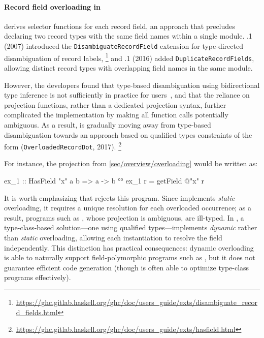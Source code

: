 \documentclass[acmsmall,screen,nonacm%
\Anonymous{,anonymous}{}%
\Final{}{,review}%
]{acmart}
\providecommand{\DIFadd}[1]{\protect\cbstart{\protect\color{blue}#1}\protect\cbend} %
\providecommand{\DIFdel}[1]{\protect\cbdelete{\protect\color{red}#1}\protect\cbdelete} %
\providecommand{\DIFaddbegin}{} %
\providecommand{\DIFaddend}{} %
\providecommand{\DIFdelbegin}{} %
\providecommand{\DIFdelend}{} %
\begin{document}
\paragraph{Record field overloading in \GHC}

 derives selector functions for each record field, an approach that
precludes declaring two record types with the same field names within a single
module. .1 (2007) introduced the \texttt{DisambiguateRecordField}
extension for type-directed disambiguation of record labels,%
%
\footnote{
  \url{https://ghc.gitlab.haskell.org/ghc/doc/users_guide/exts/disambiguate_record_fields.html}
}
%
and .1 (2016) added \texttt{DuplicateRecordFields}, allowing distinct
record types with overlapping field names in the same module.

However, the \GHC developers found that type-based disambiguation using
bidirectional type inference is not sufficiently \DIFdelbegin \DIFdel{predictible }\DIFdelend \DIFaddbegin \DIFadd{predictable }\DIFaddend in practice
for users~\citep*{RFC-overloaded-record-fields}, and that the reliance on
projection functions, rather than a dedicated projection syntax, further
complicated the implementation by making all function calls potentially
ambiguous. As a result, \GHC is gradually moving away from type-based
disambiguation towards an approach based on qualified types constraints of the
form  (\texttt{OverloadedRecordDot}, 2017).%
\footnote{
  \url{https://ghc.gitlab.haskell.org/ghc/doc/users_guide/exts/hasfield.html}
}

For instance, the projection  from \cref{sec/overview/overloading}
would be written as:
%
\begin{program}[input]
ex_1 :: HasField "x" a b => a -> b °°
ex_1 r = getField @"x" r
\end{program}
%
It is worth emphasizing that \OML rejects this program. Since \OML implements
\emph{static} overloading, it requires a unique resolution for each overloaded
occurrence; as a result, programs such as , whose projection is
ambiguous, are ill-typed. In \DIFdelbegin \DIFdel{constrast}\DIFdelend \DIFaddbegin \DIFadd{contrast}\DIFaddend , a type-class-based solution---\ie one
using qualified types---implements \emph{dynamic} rather than \emph{static}
overloading, allowing each instantiation to resolve the field independently.
This distinction has practical consequences: dynamic overloading is able to
naturally support field-polymorphic programs such as , but it does
not guarantee efficient code generation (though \GHC is often able to optimize
type-class programs effectively).
\end{document}
